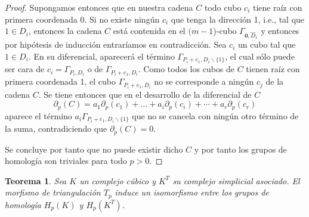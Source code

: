 \documentclass[12pt,a4paper,twoside]{article} %
\theoremstyle{plain}
\newtheorem{teorema}{Teorema}[subsection]
\theoremstyle{definition}
\begin{document}
\begin{proof}
Supongamos entonces que en nuestra cadena $C$ todo cubo $c_i$ tiene raíz con primera coordenada 0. Si no existe ningún $c_i$ que tenga la dirección 1, i.e., tal que $1 \in D_i$, entonces la cadena $C$ está contenida en el $(m-1$)-cubo $\Gamma_{\bm{0},\hat{D}_1}$ y entonces por hipótesis de inducción entraríamos en contradicción. Sea $c_i$ un cubo tal que $1 \in D_i$. En su diferencial, aparecerá el término $\Gamma_{P_i+e_1,D_i \backslash \{ 1\}}$, el cual sólo puede ser cara de $c_i=\Gamma_{P_i,D_i}$ o de $\Gamma_{P_i+e_1,D_i}$. Como todos los cubos de $C$ tienen raíz con primera coordenada 1, el cubo $\Gamma_{P_i+e_1,D_i}$ no se corresponde a ningún $c_j$ de la cadena $C$. Se tiene entonces que en el desarrollo de la diferencial de $C$
$$ \partial_p(C) = a_1\partial_p(c_1) + \dots + a_i\partial_p(c_i) + \cdots + a_r \partial_p(c_r) $$
aparece el término $a_i \Gamma_{P_i+e_1,D_i \backslash \{ 1\}}$ que no se cancela con ningún otro término de la suma, contradiciendo que $\partial_p (C) = 0$.

Se concluye por tanto que no puede existir dicho $C$ y por tanto los grupos de homología son triviales para todo $p>0$.
\end{proof}

\newpage
\begin{teorema}
Sea $K$ un complejo cúbico y $K^T$ su complejo simplicial asociado. El morfismo de triangulación $T_p$ induce un isomorfismo entre los grupos de homología $H_p(K)$ y $H_p(K^T)$.
\end{teorema}
\end{document}

